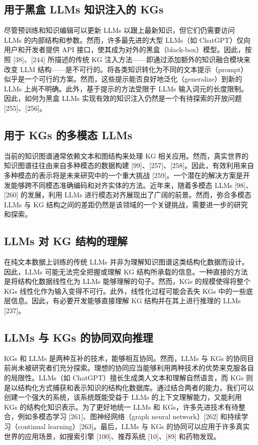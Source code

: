 \documentclass[11pt,UTF8,fontset=fandol]{ctexart}
\begin{document}
\subsection{用于黑盒 LLMs 知识注入的 KGs}

尽管预训练和知识编辑可以更新 LLMs 以跟上最新知识，但它们仍需要访问 LLMs 的内部结构和参数。然而，许多最先进的大型 LLMs（如 ChatGPT）仅向用户和开发者提供 API 接口，使其成为对外的黑盒（black-box）模型。因此，按照 [38]、[244] 所描述的传统 KG 注入方法——即通过添加额外的知识融合模块来改变 LLM 结构——是不可行的。将各类知识转化为不同的文本提示（prompt）似乎是一个可行的方案。然而，这些提示能否良好地泛化（generalize）到新的 LLMs 上尚不明确。此外，基于提示的方法受限于 LLMs 输入词元的长度限制。因此，如何为黑盒 LLMs 实现有效的知识注入仍然是一个有待探索的开放问题 [255]、[256]。

\subsection{用于 KGs 的多模态 LLMs}

当前的知识图谱通常依赖文本和图结构来处理 KG 相关应用。然而，真实世界的知识图谱往往由来自多种模态的数据构建 [99]、[257]、[258]。因此，有效利用来自多种模态的表示将是未来研究中的一个重大挑战 [259]。一个潜在的解决方案是开发能够跨不同模态准确编码和对齐实体的方法。近年来，随着多模态 LLMs [98]、[260] 的发展，利用 LLMs 进行模态对齐展现出了广阔的前景。然而，弥合多模态 LLMs 与 KG 结构之间的差距仍然是该领域的一个关键挑战，需要进一步的研究和探索。

\subsection{LLMs 对 KG 结构的理解}

在纯文本数据上训练的传统 LLMs 并非为理解知识图谱这类结构化数据而设计。因此，LLMs 可能无法完全把握或理解 KG 结构所承载的信息。一种直接的方法是将结构化数据线性化为 LLMs 能够理解的句子。然而，KGs 的规模使得将整个 KGs 线性化作为输入变得不可行。此外，线性化过程可能会丢失 KGs 中的一些底层信息。因此，有必要开发能够直接理解 KG 结构并在其上进行推理的 LLMs [237]。

\subsection{LLMs 与 KGs 的协同双向推理}

KGs 和 LLMs 是两种互补的技术，能够相互协同。然而，LLMs 与 KGs 的协同目前尚未被研究者们充分探索。理想的协同应当能够利用两种技术的优势来克服各自的局限性。LLMs（如 ChatGPT）擅长生成类人文本和理解自然语言，而 KGs 则是以结构化方式捕获和表示知识的结构化数据库。通过结合两者的能力，我们可以创建一个强大的系统，该系统既能受益于 LLMs 的上下文理解能力，又能利用 KGs 的结构化知识表示。为了更好地统一 LLMs 和 KGs，许多先进技术有待整合，例如多模态学习 [261]、图神经网络（graph neural network）[262] 和持续学习（continual learning）[263]。最后，LLMs 与 KGs 的协同可以应用于许多真实世界的应用场景，如搜索引擎 [100]、推荐系统 [10]、[89] 和药物发现。
\end{document}

